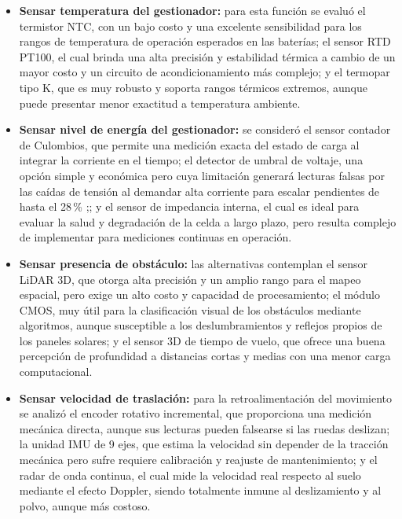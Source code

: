 \begin{itemize}
	\item \textbf{Sensar temperatura del gestionador:} para esta función se evaluó el termistor NTC, con un bajo costo y una excelente sensibilidad para los rangos de temperatura de operación esperados en las baterías; el sensor RTD PT100, el cual brinda una alta precisión y estabilidad térmica a cambio de un mayor costo y un circuito de acondicionamiento más complejo; y el termopar tipo K, que es muy robusto y soporta rangos térmicos extremos, aunque puede presentar menor exactitud a temperatura ambiente.
	
	\item \textbf{Sensar nivel de energía del gestionador:} se consideró el sensor contador de Culombios, que permite una medición exacta del estado de carga al integrar la corriente en el tiempo; el detector de umbral de voltaje, una opción simple y económica pero cuya limitación generará lecturas falsas por las caídas de tensión al demandar alta corriente para escalar pendientes de hasta el 28\,\% \citep{GarciaSalinas2025};; y el sensor de impedancia interna, el cual es ideal para evaluar la salud y degradación de la celda a largo plazo, pero resulta complejo de implementar para mediciones continuas en operación.
	
	\item \textbf{Sensar presencia de obstáculo:} las alternativas contemplan el sensor LiDAR 3D, que otorga alta precisión y un amplio rango para el mapeo espacial, pero exige un alto costo y capacidad de procesamiento; el módulo CMOS, muy útil para la clasificación visual de los obstáculos mediante algoritmos, aunque susceptible a los deslumbramientos y reflejos propios de los paneles solares; y el sensor 3D de tiempo de vuelo, que ofrece una buena percepción de profundidad a distancias cortas y medias con una menor carga computacional.
	
	\item \textbf{Sensar velocidad de traslación:} para la retroalimentación del movimiento se analizó el encoder rotativo incremental, que proporciona una medición mecánica directa, aunque sus lecturas pueden falsearse si las ruedas deslizan; la unidad IMU de 9 ejes, que estima la velocidad sin depender de la tracción mecánica pero sufre requiere calibración y reajuste de mantenimiento; y el radar de onda continua, el cual mide la velocidad real respecto al suelo mediante el efecto Doppler, siendo totalmente inmune al deslizamiento y al polvo, aunque más costoso.
	

\end{itemize}
